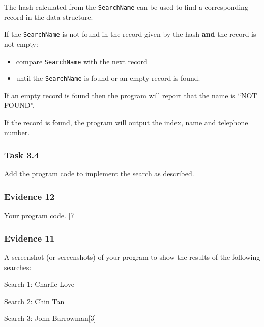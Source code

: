 The hash calculated from the \texttt{SearchName} can be used to find
a corresponding record in the data structure.

If the \texttt{SearchName} is not found in the record given by the
hash \textbf{and} the record is not empty:
\begin{itemize}
\item compare \texttt{SearchName} with the next record
\item until the \texttt{SearchName} is found or an empty record is found.
\end{itemize}
If an empty record is found then the program will report that the
name is \textquotedblleft NOT FOUND\textquotedblright .

If the record is found, the program will output the index, name and
telephone number.

\subsubsection*{Task 3.4}

Add the program code to implement the search as described.

\subsubsection*{Evidence 12}

Your program code. \hfill{}{[}7{]}

\subsubsection*{Evidence 11}

A screenshot (or screenshots) of your program to show the results
of the following searches:

Search 1: Charlie Love

Search 2: Chin Tan

Search 3: John Barrowman\hfill{}{[}3{]}